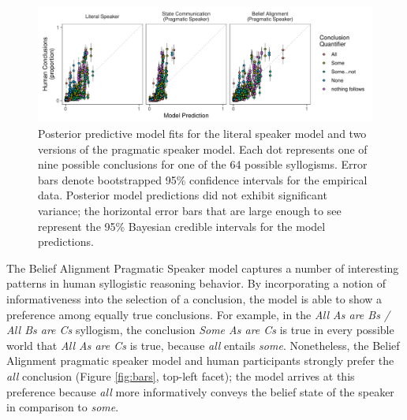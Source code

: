 \documentclass[floatsintext, doc]{apa6}
\begin{document}
\begin{figure}[t]
\centering
\includegraphics[width = \textwidth]{figs/bda_rsa_scatters_0paramPrior.pdf}
\caption{Posterior predictive model fits for the literal speaker model and two versions of the pragmatic speaker model. Each dot represents one of nine possible conclusions for one of the 64 possible syllogisms. Error bars denote bootstrapped 95\% confidence intervals for the empirical data. Posterior model predictions did not exhibit significant variance; the horizontal error bars that are large enough to see represent the 95\% Bayesian credible intervals for the model predictions.}
\label{fig:scatters}
\end{figure}

The Belief Alignment Pragmatic Speaker model captures a number of interesting patterns in human syllogistic reasoning behavior. 
By incorporating a notion of informativeness into the selection of a conclusion, the model is able to  show a preference among equally true conclusions. For example, in the \emph{All As are Bs / All Bs are Cs} syllogism, the conclusion \emph{Some As are Cs} is true in every possible world that \emph{All As are Cs} is true, because \emph{all} entails \emph{some}. Nonetheless, the Belief Alignment pragmatic speaker model and human participants strongly prefer the \emph{all} conclusion (Figure \ref{fig:bars}, top-left facet); the model arrives at this preference because \emph{all} more informatively conveys the belief state of the speaker in comparison to \emph{some}.
\end{document}
